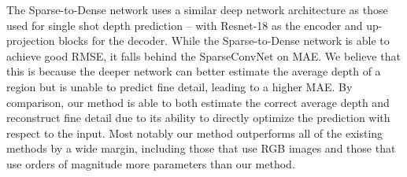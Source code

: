 
The Sparse-to-Dense network uses a similar deep network architecture as those used for single shot depth prediction -- with Resnet-18 as the encoder and up-projection blocks for the decoder. %
While the Sparse-to-Dense network is able to achieve good RMSE, it falls behind the SparseConvNet on MAE. We believe that this is because the deeper network can better estimate the average depth of a region but is unable to predict fine detail, leading to a higher MAE. By comparison, our method is able to both estimate the correct average depth and reconstruct fine detail due to its ability to directly optimize the prediction with respect to the input. Most notably our method outperforms all of the existing methods by a wide margin, including those that use RGB images and those that use orders of magnitude more parameters than our method.

